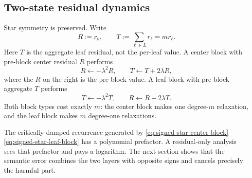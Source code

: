 \subsection{Two-state residual dynamics}

Star symmetry is preserved.  Write
\begin{equation}
  R:=r_o,
  \qquad
  T:=\sum_{\ell\in L}r_\ell=m r_\ell.
  \label{eq:signed-star-aggregate-residual}
\end{equation}
Here $T$ is the aggregate leaf residual, not the per-leaf value.  A center
block with pre-block center residual $R$ performs
\begin{equation}
  R\leftarrow-\lambda^2R,
  \qquad
  T\leftarrow T+2\lambda R,
  \label{eq:signed-star-center-block}
\end{equation}
where the $R$ on the right is the pre-block value.  A leaf block with
pre-block aggregate $T$ performs
\begin{equation}
  T\leftarrow-\lambda^2T,
  \qquad
  R\leftarrow R+2\lambda T.
  \label{eq:signed-star-leaf-block}
\end{equation}
Both block types cost exactly $m$: the center block makes one degree-$m$
relaxation, and the leaf block makes $m$ degree-one relaxations.

The critically damped recurrence generated by
\eqref{eq:signed-star-center-block}--\eqref{eq:signed-star-leaf-block} has a
polynomial prefactor.  A residual-only analysis sees that prefactor and pays a
logarithm.  The next section shows that the semantic error combines the two
layers with opposite signs and cancels precisely the harmful part.
